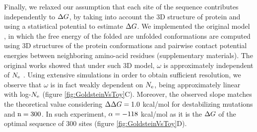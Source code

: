 Finally, we relaxed our assumption that each site of the sequence contributes independently to $\Delta G$, by taking into account the $3$D structure of protein and using a statistical potential to estimate $\Delta G$.
We implemented the original model \citep{Williams2006, Goldstein2011, Pollock2012}, in which the free energy of the folded are unfolded conformations are computed using $3$D structures of the protein conformations and pairwise contact potential energies between neighboring amino-acid residues \citep{Miyazawa1985} (supplementary materials).
The original works showed that under such $3$D model, $\omega$ is approximately independent of $N_{\mathrm{e}}$ \citep{Goldstein2013}.
Using extensive simulations in order to obtain sufficient resolution, we observe that $\omega$ is in fact weakly dependent on $N_{\mathrm{e}}$, being approximately linear with log-$N_{\mathrm{e}}$ (figure \ref{fig:GoldsteinVsToy}C).
Moreover, the observed slope matches the theoretical value considering $\Delta \Delta G = 1.0$ kcal/mol for destabilizing mutations and $\text{n}=300$. 
In such experiment, $\alpha=-118$ kcal/mol as it is the $\Delta G$ of the optimal sequence of $300$ sites \citep{Goldstein2011} (figure \ref{fig:GoldsteinVsToy}D).
